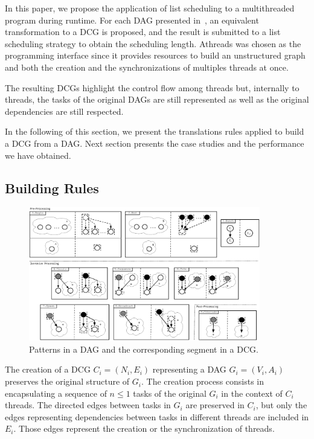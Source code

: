 \documentclass[twocolumn]{svjour3}
\begin{document}
In this paper, we propose the application of list scheduling to a multithreaded program during runtime. For each DAG presented in~\cite{Graham76}, an equivalent transformation to a DCG is proposed, and the result is submitted to a list scheduling strategy to obtain the scheduling length. Athreads was chosen as the programming interface since it provides resources to build an unstructured graph and both the creation and the synchronizations of multiples threads at once.

The resulting DCGs highlight the control flow among threads but, internally to threads, the tasks of the original DAGs are still represented as well as the original {\color{blue}dependencies} are still respected.

In the following of this section, we present the translations rules applied to build a DCG from a DAG. Next section presents the case studies and the performance we have obtained.

\subsection{Building Rules}

\begin{figure}[htb]
\begin{center}
\includegraphics[width=0.9\textwidth,angle=0]{figs/shapes_definitivo.eps}
\caption{Patterns in a DAG and the corresponding segment in a DCG.}
\label{fig:shapes}
\end{center}
\end{figure}

The creation of a DCG $C_i = (N_i,E_i)$ representing a DAG $G_i = (V_i,A_i)$ preserves the original structure of $G_i$. The creation process consists in encapsulating a sequence of $n \le 1$ tasks of the original $G_i$ in the context of $C_i$ threads. The directed edges between tasks in $G_i$ are preserved in $C_i$, but only the edges representing {\color{blue}dependencies} between tasks in different threads are included in $E_i$. Those edges represent the creation or the synchronization of threads.
\end{document}
